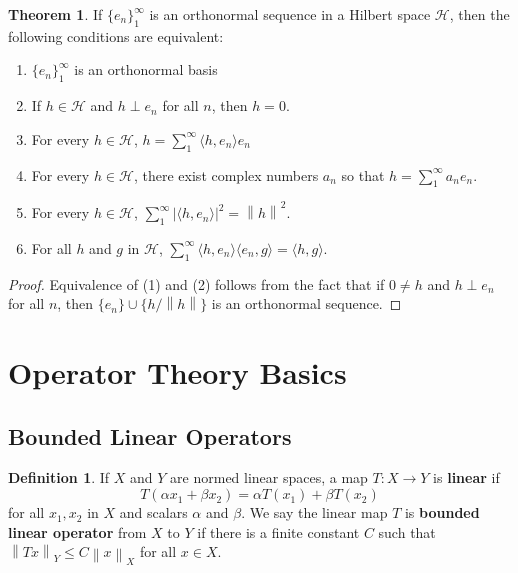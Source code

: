 \documentclass{article}
\theoremstyle{definition}
\newtheorem{theorem}{Theorem}
\newtheorem*{defn}{Definition}
\newcommand{\norm}[1]{\left\lVert#1\right\rVert}
\begin{document}
    \begin{theorem}
        If $\{e_n\}_1^{\infty}$ is an orthonormal sequence in a Hilbert space $\mathcal{H}$, then the following conditions
        are equivalent:
        \begin{enumerate}
            \item $\{e_n\}_1^{\infty}$ is an orthonormal basis
            \item If $h\in\mathcal{H}$ and $h\perp e_n$ for all $n$, then $h = 0$.
            \item For every $h\in\mathcal{H}$, $h = \sum_1^{\infty} \langle h,e_n\rangle e_n$
            \item For every $h\in\mathcal{H}$, there exist complex numbers $a_n$ so that $h = \sum_1^{\infty} a_ne_n$.
            \item For every $h\in\mathcal{H}$, $\sum_1^{\infty}|\langle h,e_n\rangle|^2 = \norm{h}^2$.
            \item For all $h$ and $g$ in $\mathcal{H}$, $\sum_1^{\infty} \langle h,e_n\rangle\langle e_n,g\rangle = \langle h,g\rangle$.
        \end{enumerate}
    \end{theorem}
    \begin{proof}
        Equivalence of (1) and (2) follows from the fact that if $0\neq h$ and $h\perp e_n$ for all $n$, then $\{e_n\}\cup\{h/\norm{h}\}$
        is an orthonormal sequence.
    \end{proof}

    \section{Operator Theory Basics}

    \subsection{Bounded Linear Operators}

    \begin{defn}
        If $X$ and $Y$ are normed linear spaces, a map $T:X\to Y$ is \textbf{linear} if
        \[ T(\alpha x_1 + \beta x_2) = \alpha T(x_1) + \beta T(x_2) \]
        for all $x_1,x_2$ in $X$ and scalars $\alpha$ and $\beta$. We say the linear map $T$ is \textbf{bounded linear operator}
        from $X$ to $Y$ if there is a finite constant $C$ such that $\norm{Tx}_Y \leq C\norm{x}_X$ for all $x\in X$.
    \end{defn}
\end{document}
